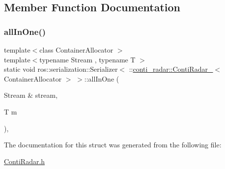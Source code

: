 \subsection{Member Function Documentation}
\mbox{\label{structros_1_1serialization_1_1Serializer_3_01_1_1conti__radar_1_1ContiRadar___3_01ContainerAllocator_01_4_01_4_a4bcf8b17779549d340ba106e9c3ebf4b}} 
\subsubsection{\texorpdfstring{all\+In\+One()}{allInOne()}}
{\footnotesize\ttfamily template$<$class Container\+Allocator $>$ \\
template$<$typename Stream , typename T $>$ \\
static void ros\+::serialization\+::\+Serializer$<$ \+::\hyperlink{structconti__radar_1_1ContiRadar__}{conti\+\_\+radar\+::\+Conti\+Radar\+\_\+}$<$ Container\+Allocator $>$ $>$\+::all\+In\+One (\begin{DoxyParamCaption}\item[{Stream \&}]{stream,  }\item[{T}]{m }\end{DoxyParamCaption})\hspace{0.3cm}{\ttfamily [inline]}, {\ttfamily [static]}}



The documentation for this struct was generated from the following file\+:\begin{DoxyCompactItemize}
\item 
\hyperlink{ContiRadar_8h}{Conti\+Radar.\+h}\end{DoxyCompactItemize}
